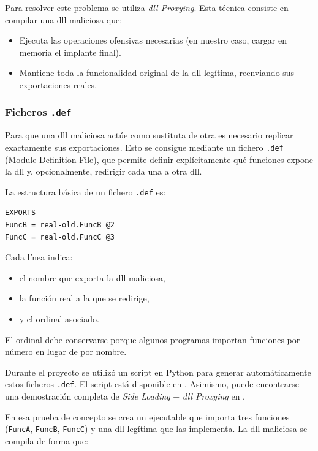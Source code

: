 Para resolver este problema se utiliza \textit{\acrshort{dll} Proxying}. Esta técnica consiste en compilar una \acrshort{dll} maliciosa que:

\begin{itemize}
\item Ejecuta las operaciones ofensivas necesarias (en nuestro caso, cargar en memoria el implante final).
\item Mantiene toda la funcionalidad original de la \acrshort{dll} legítima, reenviando sus exportaciones reales.
\end{itemize}

\subsubsection*{Ficheros \texttt{.def}}

Para que una \acrshort{dll} maliciosa actúe como sustituta de otra es necesario replicar exactamente sus exportaciones. Esto se consigue mediante un fichero \texttt{.def} (Module Definition File), que permite definir explícitamente qué funciones expone la \acrshort{dll} y, opcionalmente, redirigir cada una a otra \acrshort{dll}.

La estructura básica de un fichero \texttt{.def} es:

\begin{verbatim}
EXPORTS
FuncB = real-old.FuncB @2
FuncC = real-old.FuncC @3
\end{verbatim}

Cada línea indica:

\begin{itemize}
\item el nombre que exporta la \acrshort{dll} maliciosa,
\item la función real a la que se redirige,
\item y el ordinal asociado.
\end{itemize}

El ordinal debe conservarse porque algunos programas importan funciones por número en lugar de por nombre.

Durante el proyecto se utilizó un script en Python para generar automáticamente estos ficheros \texttt{.def}. El script está disponible en \cite{exports_py}.
Asimismo, puede encontrarse una demostración completa de \textit{Side Loading} + \textit{\acrshort{dll} Proxying} en \cite{dll_proxy_demo}.

En esa prueba de concepto se crea un ejecutable que importa tres funciones (\texttt{FuncA}, \texttt{FuncB}, \texttt{FuncC}) y una \acrshort{dll} legítima que las implementa. La \acrshort{dll} maliciosa se compila de forma que:

